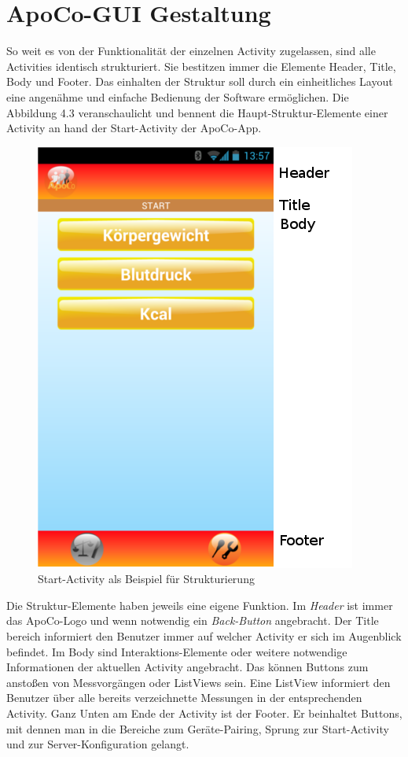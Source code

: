 


\section{ApoCo-GUI Gestaltung}

So weit es von der Funktionalit\"at der einzelnen Activity zugelassen, sind alle Activities identisch strukturiert.
Sie bestitzen immer die Elemente Header, Title, Body und Footer.
Das einhalten der Struktur soll durch ein einheitliches Layout eine angen\"ahme und einfache Bedienung der Software erm\"oglichen.
Die Abbildung 4.3 veranschaulicht und bennent die Haupt-Struktur-Elemente einer Activity an hand der Start-Activity der ApoCo-App.

\begin{figure}[h]
  \centering
  \includegraphics[scale=0.5]{screenshots/kapitel4/gui/activity_struktur.png}
  \caption{Start-Activity als Beispiel f\"ur Strukturierung}
  
\end{figure}

Die Struktur-Elemente haben jeweils eine eigene Funktion.
Im \emph{Header} ist immer das ApoCo-Logo und wenn notwendig ein \emph{Back-Button} angebracht.
Der Title bereich informiert den Benutzer immer auf welcher Activity er sich im Augenblick befindet.
Im Body sind Interaktions-Elemente oder weitere notwendige Informationen der aktuellen Activity angebracht.
Das k\"onnen Buttons zum ansto\ss{}en von Messvorg\"angen oder ListViews sein.
Eine ListView informiert den Benutzer \"uber alle bereits verzeichnette Messungen in der entsprechenden Activity.
Ganz Unten am Ende der Activity ist der Footer.
Er beinhaltet Buttons, mit dennen man in die Bereiche zum Ger\"ate-Pairing, Sprung zur Start-Activity und zur Server-Konfiguration gelangt.

